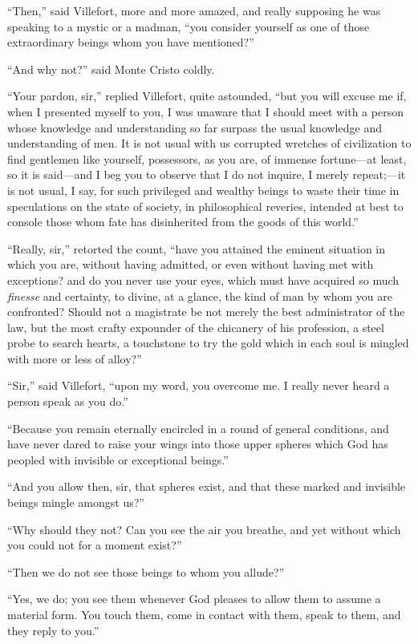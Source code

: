 “Then,” said Villefort, more and more amazed, and really supposing he
was speaking to a mystic or a madman, “you consider yourself as one of
those extraordinary beings whom you have mentioned?”

“And why not?” said Monte Cristo coldly.

“Your pardon, sir,” replied Villefort, quite astounded, “but you will
excuse me if, when I presented myself to you, I was unaware that I
should meet with a person whose knowledge and understanding so far
surpass the usual knowledge and understanding of men. It is not usual
with us corrupted wretches of civilization to find gentlemen like
yourself, possessors, as you are, of immense fortune—at least, so it is
said—and I beg you to observe that I do not inquire, I merely
repeat;—it is not usual, I say, for such privileged and wealthy beings
to waste their time in speculations on the state of society, in
philosophical reveries, intended at best to console those whom fate has
disinherited from the goods of this world.”

“Really, sir,” retorted the count, “have you attained the eminent
situation in which you are, without having admitted, or even without
having met with exceptions? and do you never use your eyes, which must
have acquired so much \textit{finesse} and certainty, to divine, at a glance,
the kind of man by whom you are confronted? Should not a magistrate be
not merely the best administrator of the law, but the most crafty
expounder of the chicanery of his profession, a steel probe to search
hearts, a touchstone to try the gold which in each soul is mingled with
more or less of alloy?”

“Sir,” said Villefort, “upon my word, you overcome me. I really never
heard a person speak as you do.”

“Because you remain eternally encircled in a round of general
conditions, and have never dared to raise your wings into those upper
spheres which God has peopled with invisible or exceptional beings.”

“And you allow then, sir, that spheres exist, and that these marked and
invisible beings mingle amongst us?”

“Why should they not? Can you see the air you breathe, and yet without
which you could not for a moment exist?”

“Then we do not see those beings to whom you allude?”

“Yes, we do; you see them whenever God pleases to allow them to assume
a material form. You touch them, come in contact with them, speak to
them, and they reply to you.”

